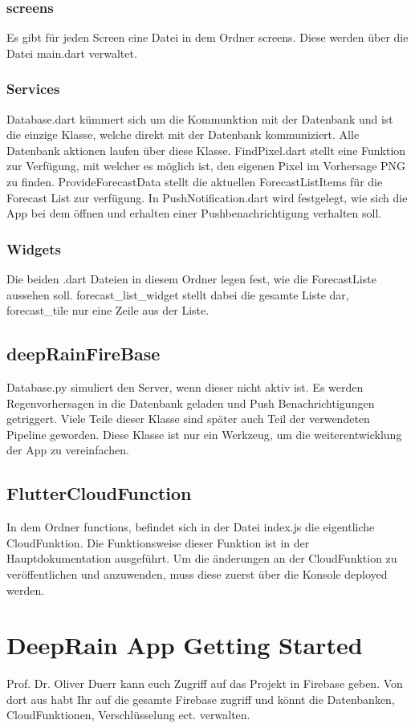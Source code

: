 \subsubsection*{screens}
Es gibt für jeden Screen eine Datei in dem Ordner screens. Diese werden über die Datei main.dart verwaltet. 
\subsubsection*{Services}
Database.dart kümmert sich um die Kommunktion mit der Datenbank und ist die einzige Klasse, welche direkt mit der Datenbank 
kommuniziert. Alle Datenbank aktionen laufen über diese Klasse. 
FindPixel.dart stellt eine Funktion zur Verfügung, mit welcher es möglich ist, den eigenen Pixel im Vorhersage PNG zu finden. 
ProvideForecastData stellt die aktuellen ForecastListItems für die Forecast List zur verfügung. 
In PushNotification.dart wird festgelegt, wie sich die App bei dem öffnen und erhalten einer Pushbenachrichtigung verhalten soll. 
\subsubsection*{Widgets}
Die beiden .dart Dateien in diesem Ordner legen fest, wie die ForecastListe aussehen soll. forecast\_list\_widget stellt 
dabei die gesamte Liste dar, forecast\_tile nur eine Zeile aus der Liste. 

\subsection{deepRainFireBase}
Database.py simuliert den Server, wenn dieser nicht aktiv ist. 
Es werden Regenvorhersagen in die Datenbank geladen und Push Benachrichtigungen getriggert.
Viele Teile dieser Klasse sind später auch Teil der verwendeten Pipeline geworden. 
Diese Klasse ist nur ein Werkzeug, um die weiterentwicklung der App zu vereinfachen. 

\subsection{FlutterCloudFunction}
In dem Ordner functions, befindet sich in der Datei index.js die eigentliche CloudFunktion.
Die Funktionsweise dieser Funktion ist in der Hauptdokumentation ausgeführt. 
Um die änderungen an der CloudFunktion zu veröffentlichen und anzuwenden, muss diese zuerst über die Konsole 
deployed werden. 

\section{DeepRain App Getting Started}
Prof. Dr. Oliver Duerr kann euch Zugriff auf das Projekt in Firebase geben. 
Von dort aus habt Ihr auf die gesamte Firebase zugriff und könnt die Datenbanken, CloudFunktionen, Verschlüsselung ect. verwalten. 

